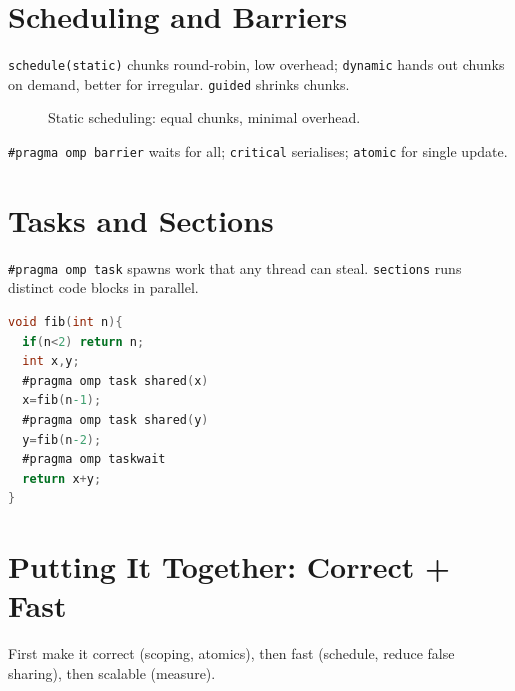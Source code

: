 \section{Scheduling and Barriers}\label{sec:schedule}
\texttt{schedule(static)} chunks round-robin, low overhead; \texttt{dynamic} hands out chunks on demand, better for irregular. \texttt{guided} shrinks chunks.

\begin{figure}[h]\centering
{}
\caption{Static scheduling: equal chunks, minimal overhead.}
\label{fig:static}
\end{figure}

\texttt{\#pragma omp barrier} waits for all; \texttt{critical} serialises; \texttt{atomic} for single update.

\section{Tasks and Sections}\label{sec:tasks}
\texttt{\#pragma omp task} spawns work that any thread can steal. \texttt{sections} runs distinct code blocks in parallel.

\begin{lstlisting}[language=C,caption={OpenMP tasks for divide-and-conquer.}]
void fib(int n){
  if(n<2) return n;
  int x,y;
  #pragma omp task shared(x)
  x=fib(n-1);
  #pragma omp task shared(y)
  y=fib(n-2);
  #pragma omp taskwait
  return x+y;
}
\end{lstlisting}

\section{Putting It Together: Correct + Fast}\label{sec:correctfast}
First make it correct (scoping, atomics), then fast (schedule, reduce false sharing), then scalable (measure).


